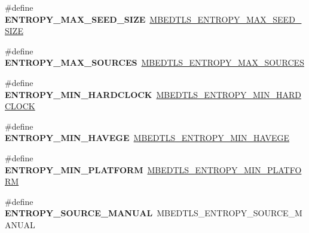 \begin{DoxyCompactItemize}
\item 
\mbox{\label{compat-1_83_8h_a23cd05df3838590ba3b1688290c9c1fa}} 
\#define {\bfseries E\+N\+T\+R\+O\+P\+Y\+\_\+\+M\+A\+X\+\_\+\+S\+E\+E\+D\+\_\+\+S\+I\+ZE}~\mbox{\hyperlink{entropy_8h_afff6ba3d7fc6df1fedd007d3a9a4136b}{M\+B\+E\+D\+T\+L\+S\+\_\+\+E\+N\+T\+R\+O\+P\+Y\+\_\+\+M\+A\+X\+\_\+\+S\+E\+E\+D\+\_\+\+S\+I\+ZE}}
\item 
\mbox{\label{compat-1_83_8h_a5e9ba2c083acc78efc758deca62d162d}} 
\#define {\bfseries E\+N\+T\+R\+O\+P\+Y\+\_\+\+M\+A\+X\+\_\+\+S\+O\+U\+R\+C\+ES}~\mbox{\hyperlink{entropy_8h_a819aa4f3046aa257738f0dafe481ca1f}{M\+B\+E\+D\+T\+L\+S\+\_\+\+E\+N\+T\+R\+O\+P\+Y\+\_\+\+M\+A\+X\+\_\+\+S\+O\+U\+R\+C\+ES}}
\item 
\mbox{\label{compat-1_83_8h_a790c9f23655a9bbe05053276e91ad093}} 
\#define {\bfseries E\+N\+T\+R\+O\+P\+Y\+\_\+\+M\+I\+N\+\_\+\+H\+A\+R\+D\+C\+L\+O\+CK}~\mbox{\hyperlink{entropy__poll_8h_a65c4fbcd7f6e3617f3e595f267258475}{M\+B\+E\+D\+T\+L\+S\+\_\+\+E\+N\+T\+R\+O\+P\+Y\+\_\+\+M\+I\+N\+\_\+\+H\+A\+R\+D\+C\+L\+O\+CK}}
\item 
\mbox{\label{compat-1_83_8h_a99bec0aa7de17714859f1d2c2e547c64}} 
\#define {\bfseries E\+N\+T\+R\+O\+P\+Y\+\_\+\+M\+I\+N\+\_\+\+H\+A\+V\+E\+GE}~\mbox{\hyperlink{entropy__poll_8h_a7d41a7970cd0a899aa8528ec1b95aa36}{M\+B\+E\+D\+T\+L\+S\+\_\+\+E\+N\+T\+R\+O\+P\+Y\+\_\+\+M\+I\+N\+\_\+\+H\+A\+V\+E\+GE}}
\item 
\mbox{\label{compat-1_83_8h_ac9a6394d9503c8045054a048b0d7cc0d}} 
\#define {\bfseries E\+N\+T\+R\+O\+P\+Y\+\_\+\+M\+I\+N\+\_\+\+P\+L\+A\+T\+F\+O\+RM}~\mbox{\hyperlink{entropy__poll_8h_a7bd03568eb4ced60c878a6adc46aa407}{M\+B\+E\+D\+T\+L\+S\+\_\+\+E\+N\+T\+R\+O\+P\+Y\+\_\+\+M\+I\+N\+\_\+\+P\+L\+A\+T\+F\+O\+RM}}
\item 
\mbox{\label{compat-1_83_8h_a8c3a8b8e81c2b4e3c03d3704029bca39}} 
\#define {\bfseries E\+N\+T\+R\+O\+P\+Y\+\_\+\+S\+O\+U\+R\+C\+E\+\_\+\+M\+A\+N\+U\+AL}~M\+B\+E\+D\+T\+L\+S\+\_\+\+E\+N\+T\+R\+O\+P\+Y\+\_\+\+S\+O\+U\+R\+C\+E\+\_\+\+M\+A\+N\+U\+AL
\item 
\mbox{\label{compat-1_83_8h_a428fea8893da65b2dcfc971ead294c67}} 

\end{DoxyCompactItemize}
